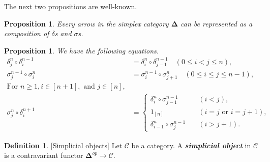 \documentclass[12pt, a4paper]{amsart}
\theoremstyle{plain}
\newtheorem{prop}[thm]{Proposition}
\theoremstyle{definition}
\newtheorem{defn}[thm]{Definition}
\numberwithin{figure}{section}
\numberwithin{table}{section}
\newcommand{\newword}[1]{\textbf{\textit{#1}}}
\numberwithin{equation}{section}
\newcommand{\bDelta}{\mathbf{\Delta}}
\begin{document}
The next two propositions are well-known.


\begin{prop}
\label{prop:simpCatDeltaSigma}
Every arrow in the simplex category
$\bDelta$
can be represented as a composition of 
$\delta$s and $\sigma$s.
\end{prop}


\begin{prop}
\label{prop:faceDegenEqs}
We have the following equations.
\begin{align}
\label{eq:deltaDelta}
\delta^n_j
	\circ
\delta^{n-1}_i
		&=
\delta^n_i
	\circ
\delta^{n-1}_{j-1}
		\quad
(0 \le i < j \le n),
		\\
\label{eq:sigmaSigma}
\sigma^{n-1}_j
	\circ
\sigma^{n}_i
		&=
\sigma^{n-1}_i
	\circ
\sigma^{n}_{j+1}
		\quad
(0 \le i \le j \le n-1),
		\\
		\nonumber
\textrm{For }
n \ge 1,
i \in [n+1],
\textrm{ and }
j \in [n],
		\\
\label{eq:sigmaDelta}
\sigma^n_j
	\circ
\delta^{n+1}_i
		&=
\begin{cases}
\delta^{n}_i
	\circ
\sigma^{n-1}_{j-1}
		&\quad
(i < j),
			\\
1_{[n]}
		&\quad
(i = j \textrm{ or } i = j+1),
			\\
\delta^{n}_{i-1}
	\circ
\sigma^{n-1}_{j}
		&\quad
(i > j+1) .
\end{cases}
\end{align}

\end{prop}


\begin{defn}{[Simplicial objects]}
\label{defn:simplicialObj}
Let
$\mathcal{C}$
be a category.
A \newword{simplicial object}
in 
$\mathcal{C}$
is a contravariant functor
$
\bDelta^{op}
	\to
\mathcal{C}
$.
\end{defn}
\end{document}
